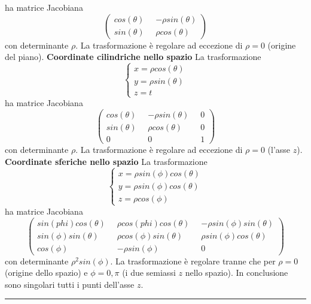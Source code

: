 ha matrice Jacobiana
\[
    \left(\begin{matrix}
        cos(\theta) \;\; & -\rho sin(\theta)\\
        sin(\theta) & \rho cos(\theta) 
    \end{matrix}\right)
\]
con determinante $\rho$. La trasformazione è regolare ad eccezione di $\rho = 0$ (origine del piano).\newline
\newline
\textbf{Coordinate cilindriche nello spazio} \newline
La trasformazione
\[
    \begin{cases}
        x= \rho cos(\theta)\\
        y =\rho sin(\theta)\\
        z = t
    \end{cases}
\]
ha matrice Jacobiana
\[
    \left(\begin{matrix}
        cos(\theta) \;\; & -\rho sin(\theta) \;\; & 0\\
        sin(\theta) & \rho cos(\theta) & 0\\
        0 & 0 &1
    \end{matrix}\right)
\]
con determinante $\rho$. La trasformazione è regolare ad eccezione di $\rho = 0$ (l'asse $z$).\newline
\newline
\textbf{Coordinate sferiche nello spazio}\newline
La trasformazione
\[
    \begin{cases}
        x= \rho sin(\phi) cos(\theta)\\
        y= \rho sin(\phi) cos(\theta)\\
        z = \rho cos(\phi)
    \end{cases}
\]
ha matrice Jacobiana
\[
    \left(\begin{matrix}
        sin(phi) cos(\theta) \;\; & \rho cos(phi) cos(\theta) \;\; & -\rho sin(\phi)sin(\theta)\\
        sin(\phi) sin(\theta) & \rho cos(\phi) sin(\theta) & \rho sin(\phi) cos(\theta)\\
        cos(\phi) & -\rho sin(\phi) & 0
    \end{matrix}\right)
\]
con determinante $\rho^2 sin(\phi)$. La trasformazione è regolare tranne che per $\rho = 0$ (origine dello spazio) e $\phi = 0, \pi$ (i due semiassi $z$ nello spazio). In conclusione sono singolari tutti i punti dell'asse $z$. \newline
\rule{\textwidth}{0,4pt}
